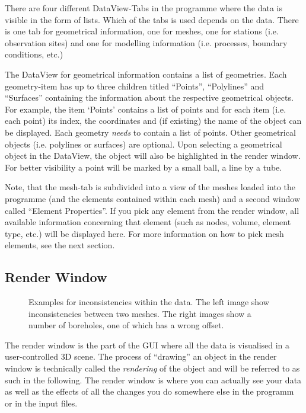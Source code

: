 There are four different DataView-Tabs in the programme where the data is visible in the form of lists. Which of the tabs is used depends on the data. There is one tab for geometrical information, one for meshes, one for stations (i.e. observation sites) and one for modelling information (i.e. processes, boundary conditions, etc.)

The DataView for geometrical information contains a list of geometries. Each geometry-item has up to three children titled ``Points'', ``Polylines'' and ``Surfaces'' containing the information about the respective geometrical objects. For example, the item `Points' contains a list of points and for each item (i.e. each point) its index, the coordinates and (if existing) the name of the object can be displayed. Each geometry \emph{needs} to contain a list of points. Other geometrical objects (i.e. polylines or surfaces) are optional. Upon selecting a geometrical object in the DataView, the object will also be highlighted in the render window. For better visibility a point will be marked by a small ball, a line by a tube.

Note, that the mesh-tab is subdivided into a view of the meshes loaded into the programme (and the elements contained within each mesh) and a second window called ``Element Properties''. If you pick any element from the render window, all available information concerning that element (such as nodes, volume, element type, etc.) will be displayed here. For more information on how to pick mesh elements, see the next section.

\subsection{Render Window}

\begin{figure}[tb]
\begin{center}
\enspace
{}
\end{center}
\caption{Examples for inconsistencies within the data. The left image show inconsistencies between two meshes. The right images show a number of boreholes, one of which has a wrong offset.} \label{fig:error}
\end{figure}

The render window is the part of the GUI where all the data is visualised in a user-controlled 3D scene. The process of ``drawing'' an object in the render window is technically called the \emph{rendering} of the object and will be referred to as such in the following. The render window is where you can actually see your data as well as the effects of all the changes you do somewhere else in the programm or in the input files.

